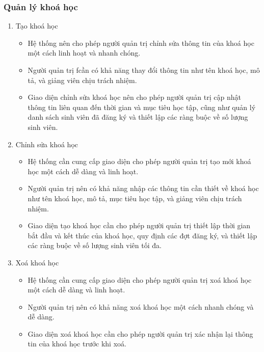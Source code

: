 \documentclass[../Thesis.tex]{subfiles}
\begin{document}
        \subsubsection{Quản lý khoá học}
            \begin{enumerate}
                \item Tạo khoá học
                    \begin{itemize}[label=$\bullet$]
                        \item Hệ thống nên cho phép người quản trị chỉnh sửa thông tin của khoá học một cách linh hoạt và nhanh chóng.
                        \item Người quản trị ƒcần có khả năng thay đổi thông tin như tên khoá học, mô tả, và giảng viên chịu trách nhiệm.
                        \item Giao diện chỉnh sửa khoá học nên cho phép người quản trị cập nhật thông tin liên quan đến thời gian và mục tiêu học tập, cũng như quản lý danh sách sinh viên đã đăng ký và thiết lập các ràng buộc về số lượng sinh viên.
                    \end{itemize}

                \item Chỉnh sửa khoá học
                    \begin{itemize}[label=$\bullet$]
                        \item Hệ thống cần cung cấp giao diện cho phép người quản trị tạo mới khoá học một cách dễ dàng và linh hoạt.
                        \item Người quản trị nên có khả năng nhập các thông tin cần thiết về khoá học như tên khoá học, mô tả, mục tiêu học tập, và giảng viên chịu trách nhiệm.
                        \item Giao diện tạo khoá học cần cho phép người quản trị thiết lập thời gian bắt đầu và kết thúc của khoá học, quy định các đợt đăng ký, và thiết lập các ràng buộc về số lượng sinh viên tối đa.
                    \end{itemize}
                \item Xoá khoá học
                    \begin{itemize}[label=$\bullet$]
                        \item Hệ thống cần cung cấp giao diện cho phép người quản trị xoá khoá học một cách dễ dàng và linh hoạt.
                        \item Người quản trị nên có khả năng xoá khoá học một cách nhanh chóng và dễ dàng.
                        \item Giao diện xoá khoá học cần cho phép người quản trị xác nhận lại thông tin của khoá học trước khi xoá.
                    \end{itemize}
            \end{enumerate}
\end{document}

